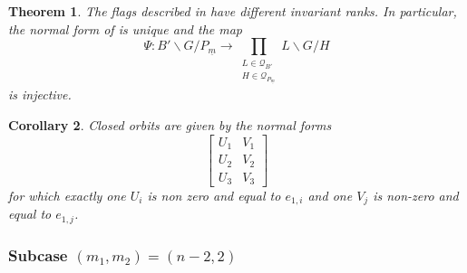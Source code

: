 \documentclass[pdftex]{sigma}
\numberwithin{equation}{section}
\newtheorem{Theorem}{Theorem}[section]
\newtheorem{Corollary}[Theorem]{Corollary}
\theoremstyle{definition}
\newtheorem{Remark}[Theorem]{Remark}
\theoremstyle{plain}
\theoremstyle{plain}
\theoremstyle{plain}
\theoremstyle{plain}
\begin{document}
\begin{Theorem}
	The flags described in  have different invariant ranks. In particular, the normal form of  is unique and the map
	\begin{equation*}
		\Psi : B'\backslash G/P_{\underline m} \to \displaystyle \prod_{\substack{L \in \mathcal Q_{B'} \\ H \in \mathcal Q_{P_{\underline m}}}} L\backslash G/H
	\end{equation*}
	is injective.
\end{Theorem}

\begin{Corollary}
	Closed orbits are given by the normal forms
	\begin{equation*}
		\begin{bmatrix}
	U_1 & V_1 \\
	U_2 & V_2 \\
	U_3 & V_3
\end{bmatrix}
	\end{equation*}
for which exactly one $U_i$ is non zero and equal to $e_{1,i}$ and one $V_j$ is non-zero and equal to $e_{1,j}$.
\end{Corollary}

\subsubsection*{Subcase $(m_1,m_2) = (n-2,2)$}{\label{dualité}}
\end{document}
